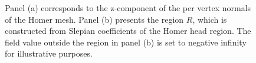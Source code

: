 \begin{figure}[htp]
	\centering
	\hfill
	\caption{
		Panel (a) corresponds to the z-component of the per vertex normals of the Homer mesh.
		Panel (b) presents the region \(R\), which is constructed from Slepian coefficients of the Homer head region.
		The field value outside the region in panel (b) is set to negative infinity for illustrative purposes.
	}\label{fig:chapter4_homer_data}
\end{figure}
